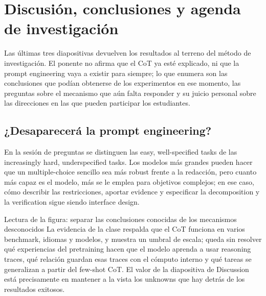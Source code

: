 \section{Discusión, conclusiones y agenda de investigación}

Las últimas tres diapositivas devuelven los resultados al terreno del método de investigación. El ponente no afirma que el CoT ya esté explicado, ni que la prompt engineering vaya a existir para siempre; lo que enumera son las conclusiones que podían obtenerse de los experimentos en ese momento, las preguntas sobre el mecanismo que aún falta responder y su juicio personal sobre las direcciones en las que pueden participar los estudiantes.

\subsection{¿Desaparecerá la prompt engineering?}

En la sesión de preguntas se distinguen las easy, well-specified tasks de las increasingly hard, underspecified tasks. Los modelos más grandes pueden hacer que un multiple-choice sencillo sea más robust frente a la redacción, pero cuanto más capaz es el modelo, más se le emplea para objetivos complejos; en ese caso, cómo describir las restricciones, aportar evidence y especificar la decomposition y la verification sigue siendo interface design.


\begin{knowledgebox}{Lectura de la figura: separar las conclusiones conocidas de los mecanismos desconocidos}
La evidencia de la clase respalda que el CoT funciona en varios benchmark, idiomas y modelos, y muestra un umbral de escala; queda sin resolver qué experiencias del pretraining hacen que el modelo aprenda a usar reasoning traces, qué relación guardan esas traces con el cómputo interno y qué tareas se generalizan a partir del few-shot CoT. El valor de la diapositiva de Discussion está precisamente en mantener a la vista los unknowns que hay detrás de los resultados exitosos.
\end{knowledgebox}


